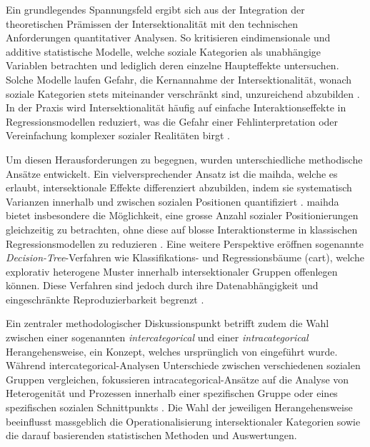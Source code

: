 Ein grundlegendes Spannungsfeld ergibt sich aus der Integration der theoretischen Prämissen der Intersektionalität mit den technischen Anforderungen quantitativer Analysen. So kritisieren \textcite{hancockWhenMultiplicationDoesnt2007} eindimensionale und additive statistische Modelle, welche soziale Kategorien als unabhängige Variablen betrachten und lediglich deren einzelne Haupteffekte untersuchen. Solche Modelle laufen Gefahr, die Kernannahme der Intersektionalität, wonach soziale Kategorien stets miteinander verschränkt sind, unzureichend abzubilden \parencite{bowlegInvitedReflectionQuantifying2016, bauerIntersectionalityQuantitativeResearch2021}. In der Praxis wird Intersektionalität häufig auf einfache Interaktionseffekte in Regressionsmodellen reduziert, was die Gefahr einer Fehlinterpretation oder Vereinfachung komplexer sozialer Realitäten birgt \parencite{bauerIntersectionalityQuantitativeResearch2021, scottIntersectionalityQuantitativeMethods2017}.

Um diesen Herausforderungen zu begegnen, wurden unterschiedliche methodische Ansätze entwickelt. Ein vielversprechender Ansatz ist die \acrfull{maihda}, welche es erlaubt, intersektionale Effekte differenziert abzubilden, indem sie systematisch Varianzen innerhalb und zwischen sozialen Positionen quantifiziert \parencite{grossModellingIntersectionalityQuantitative2023}. \gls{maihda} bietet insbesondere die Möglichkeit, eine grosse Anzahl sozialer Positionierungen gleichzeitig zu betrachten, ohne diese auf blosse Interaktionsterme in klassischen Regressionsmodellen zu reduzieren \parencite{bauerIntersectionalityQuantitativeResearch2021}. Eine weitere Perspektive eröffnen sogenannte \emph{Decision-Tree}-Verfahren wie Klassifikations- und Regressionsbäume (\acrshort{cart}), welche explorativ heterogene Muster innerhalb intersektionaler Gruppen offenlegen können. Diese Verfahren sind jedoch durch ihre Datenabhängigkeit und eingeschränkte Reproduzierbarkeit begrenzt \parencite{bauerIntersectionalityQuantitativeResearch2021}.

Ein zentraler methodologischer Diskussionspunkt betrifft zudem die Wahl zwischen einer sogenannten \emph{intercategorical} und einer \emph{intracategorical} Herangehensweise, ein Konzept, welches ursprünglich von \textcite{mccallComplexityIntersectionality2005} eingeführt wurde. Während intercategorical-Analysen Unterschiede zwischen verschiedenen sozialen Gruppen vergleichen, fokussieren intracategorical-Ansätze auf die Analyse von Heterogenität und Prozessen innerhalb einer spezifischen Gruppe oder eines spezifischen sozialen Schnittpunkts \parencite{bauerAdvancingQuantitativeIntersectionality2019}. Die Wahl der jeweiligen Herangehensweise beeinflusst massgeblich die Operationalisierung intersektionaler Kategorien sowie die darauf basierenden statistischen Methoden und Auswertungen.

